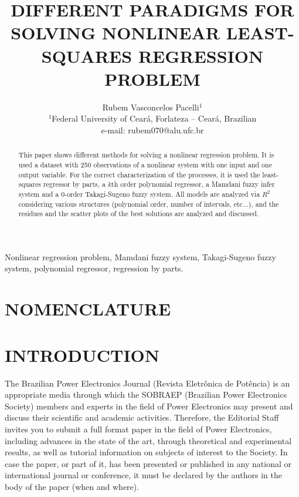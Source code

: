 \documentclass[english]{sobraep}
\title{DIFFERENT PARADIGMS FOR SOLVING NONLINEAR LEAST-SQUARES REGRESSION PROBLEM}
\author{Rubem Vasconcelos Pacelli$^{1}$\\
	\normalsize $^{1}$Federal University of Ceará, Forlateza -- Ceará, Brazilian\\
	\normalsize e-mail: rubem070@alu.ufc.br
}
\begin{document}
\maketitle

\begin{abstract}
	This paper shows different methods for solving a nonlinear regression problem. It is used a dataset with 250 observations of a nonlinear system with one input and one output variable. For the correct characterization of the processes, it is used the least-squares regressor by parts, a $k$th order polynomial regressor, a Mamdani fuzzy infer system and a 0-order Takagi-Sugeno fuzzy system. All models are analyzed via $R^2$ considering various structures (polynomial order, number of intervals, etc...), and the residues and the scatter plots of the best solutions are analyzed and discussed.
\end{abstract}

\begin{keywords}
	Nonlinear regression problem, Mamdani fuzzy system, Takagi-Sugeno fuzzy system, polynomial regressor, regression by parts. 
\end{keywords}

\let\thefootnote\relax{}

\section*{NOMENCLATURE}




\section{INTRODUCTION}

The Brazilian Power Electronics Journal (Revista Eletrônica de Potência) is an appropriate media through which the SOBRAEP (Brazilian Power Electronics Society) members and experts in the field of Power Electronics may present and discuss their scientific and academic activities. Therefore, the Editorial Staff invites you to submit a full format paper in the field of Power Electronics, including advances in the state of the art, through theoretical and experimental results, as well as tutorial information on subjects of interest to the Society. In case the paper, or part of it, has been presented or published in any national or international journal or conference, it must be declared by the authors in the body of the paper (when and where).
\end{document}
